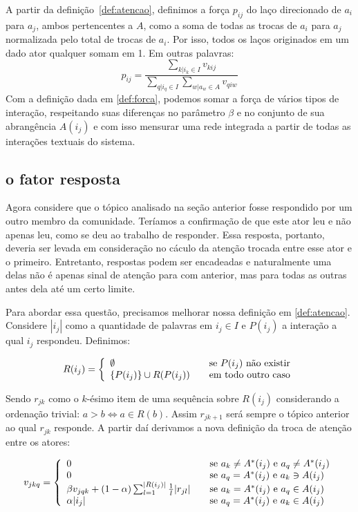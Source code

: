 \documentclass{article}
\begin{document}
A partir da definição~\ref{def:atencao}, definimos a força $p_{ij}$ do laço
direcionado de $a_i$ para $a_j$, ambos pertencentes a $A$, como a soma de todas
as trocas de $a_i$ para $a_j$ normalizada pelo total de trocas de $a_i$.
Por isso, todos os laços originados em um dado ator qualquer somam em 1. Em
outras palavras:
\begin{equation}
\label{def:forca}
p_{ij}=\frac{\sum_{k|i_k \in I}v_{kij}}{\sum_{q|i_q \in I}\sum_{w|a_w
\in A}v_{qiw}}
\end{equation}
Com a definição dada em \ref{def:forca}, podemos somar a força de vários
tipos de interação, respeitando suas diferenças no parâmetro $\beta$ e
no conjunto de sua abrangência $A(i_j)$ e com isso mensurar uma rede integrada
a partir de todas as interações textuais do sistema. 
\subsection{o fator resposta}
Agora considere que o tópico analisado na seção anterior fosse respondido por um
outro membro da comunidade. Teríamos a confirmação de que este ator leu e não
apenas leu, como se deu ao trabalho de responder. Essa resposta, portanto,
deveria ser levada em consideração no cáculo da atenção trocada entre esse ator
e o primeiro. Entretanto, respostas podem ser encadeadas e naturalmente uma
delas não é apenas sinal de atenção para com anterior, mas para todas as outras
antes dela até um certo limite.

Para abordar essa questão, precisamos melhorar nossa definição em
\ref{def:atencao}. Considere $|i_j|$ como a quantidade de palavras em $i_j
\in I$ e $P(i_j)$ a interação a qual $i_j$ respondeu. Definimos:

\begin{equation}
R(i_j) = \left\{ \begin{array}{l l} \emptyset &\quad\text{se $P(i_j)$ não
existir}\\ \{P(i_j)\} \cup R(P(i_j)) &\quad\text{em todo outro caso}\end{array}
\right.
\end{equation}

Sendo $r_{jk}$ como o $k$-ésimo item de uma sequência sobre $R(i_j)$
considerando a ordenação trivial: $a > b \iff a\in R(b)$. Assim $r_{jk+1}$ será
sempre o tópico anterior ao qual $r_{jk}$ responde. A partir daí derivamos a
nova definição da troca de atenção entre os atores:

\begin{equation}
	v_{jkq} = \left\{
	\begin{array}{l l}
		0 & \quad \text{se $a_k \neq A^*(i_j)$ e $a_q \neq A^*(i_j)$}\\
		0 & \quad \text{se $a_q =A^*(i_j)$ e $a_k \ni A(i_j)$}\\
  		\beta v_{jqk} + (1-\alpha)\sum_{l=1}^{|R(i_j)|}\frac{1}{l}|r_{jl}| & \quad
  		\text{se $a_k=A^*(i_j)$ e $a_q \in A(i_j)$}\\ \alpha|i_j| & \quad \text{se $a_q=A^*(i_j)$ e $a_k \in A(i_j)$}
	\end{array}
	\right.
\end{equation}
\end{document}
